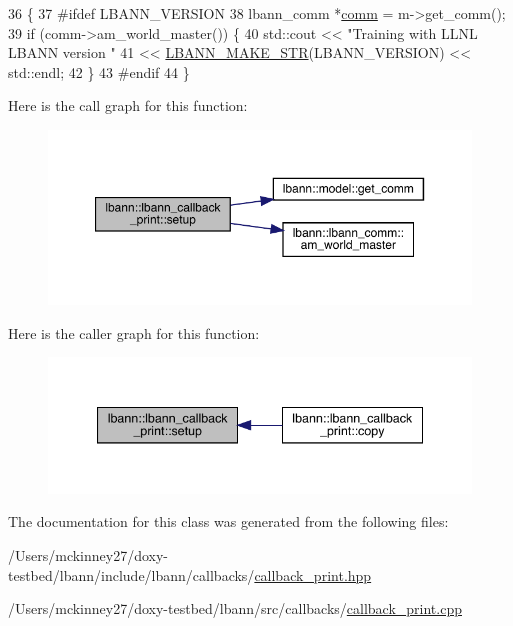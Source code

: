 \begin{DoxyCode}
36                                          \{
37 \textcolor{preprocessor}{#ifdef LBANN\_VERSION}
38   lbann\_comm *\hyperlink{file__io_8cpp_ab048c6f9fcbcfaa57ce68b00263dbebe}{comm} = m->get\_comm();
39   \textcolor{keywordflow}{if} (comm->am\_world\_master()) \{
40     std::cout << \textcolor{stringliteral}{"Training with LLNL LBANN version "}
41               << \hyperlink{base_8hpp_a78b291de8c80b35c360c22d46d44498a}{LBANN\_MAKE\_STR}(LBANN\_VERSION) << std::endl;
42   \}
43 \textcolor{preprocessor}{#endif}
44 \}
\end{DoxyCode}
Here is the call graph for this function\+:\nopagebreak
\begin{figure}[H]
\begin{center}
\leavevmode
\includegraphics[width=350pt]{classlbann_1_1lbann__callback__print_a405e20e9fa137bd377faf692cc3c54aa_cgraph}
\end{center}
\end{figure}
Here is the caller graph for this function\+:\nopagebreak
\begin{figure}[H]
\begin{center}
\leavevmode
\includegraphics[width=340pt]{classlbann_1_1lbann__callback__print_a405e20e9fa137bd377faf692cc3c54aa_icgraph}
\end{center}
\end{figure}


The documentation for this class was generated from the following files\+:\begin{DoxyCompactItemize}
\item 
/\+Users/mckinney27/doxy-\/testbed/lbann/include/lbann/callbacks/\hyperlink{callback__print_8hpp}{callback\+\_\+print.\+hpp}\item 
/\+Users/mckinney27/doxy-\/testbed/lbann/src/callbacks/\hyperlink{callback__print_8cpp}{callback\+\_\+print.\+cpp}\end{DoxyCompactItemize}
